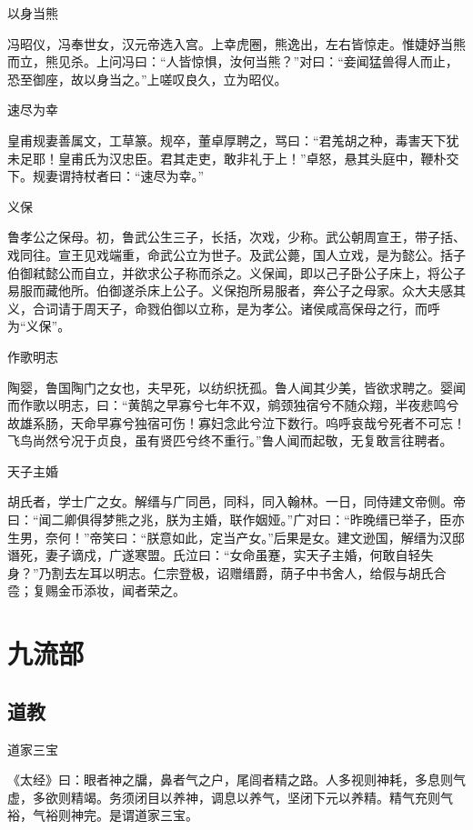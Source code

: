 \documentclass[a4paper,12pt,UTF8,twoside]{ctexbook}
\begin{document}
    以身当熊
    
    冯昭仪，冯奉世女，汉元帝选入宫。上幸虎圈，熊逸出，左右皆惊走。惟婕妤当熊而立，熊见杀。上问冯曰：“人皆惊惧，汝何当熊？”对曰：“妾闻猛兽得人而止，恐至御座，故以身当之。”上嗟叹良久，立为昭仪。
    
    速尽为幸
    
    皇甫规妻善属文，工草篆。规卒，董卓厚聘之，骂曰：“君羗胡之种，毒害天下犹未足耶！皇甫氏为汉忠臣。君其走吏，敢非礼于上！”卓怒，悬其头庭中，鞭朴交下。规妻谓持杖者曰：“速尽为幸。”
    
    义保
    
    鲁孝公之保母。初，鲁武公生三子，长括，次戏，少称。武公朝周宣王，带子括、戏同往。宣王见戏端重，命武公立为世子。及武公薨，国人立戏，是为懿公。括子伯御弒懿公而自立，并欲求公子称而杀之。义保闻，即以己子卧公子床上，将公子易服而藏他所。伯御遂杀床上公子。义保抱所易服者，奔公子之母家。众大夫感其义，合词请于周天子，命戮伯御以立称，是为孝公。诸侯咸高保母之行，而呼为“义保”。
    
    作歌明志
    
    陶婴，鲁国陶门之女也，夫早死，以纺织抚孤。鲁人闻其少美，皆欲求聘之。婴闻而作歌以明志，曰：“黄鹄之早寡兮七年不双，鹓颈独宿兮不随众翔，半夜悲鸣兮故雄系肠，天命早寡兮独宿可伤！寡妇念此兮泣下数行。呜呼哀哉兮死者不可忘！飞鸟尚然兮况于贞良，虽有贤匹兮终不重行。”鲁人闻而起敬，无复敢言往聘者。
    
    天子主婚
    
    胡氏者，学士广之女。解缙与广同邑，同科，同入翰林。一日，同侍建文帝侧。帝曰：“闻二卿俱得梦熊之兆，朕为主婚，联作姻娅。”广对曰：“昨晚缙已举子，臣亦生男，奈何！”帝笑曰：“朕意如此，定当产女。”后果是女。建文逊国，解缙为汉邸谮死，妻子谪戍，广遂寒盟。氏泣曰：“女命虽蹇，实天子主婚，何敢自轻失身？”乃割去左耳以明志。仁宗登极，诏赠缙爵，荫子中书舍人，给假与胡氏合卺；复赐金币添妆，闻者荣之。
    
    \part{九流部}
    
    \chapter{道教}
    
    道家三宝
    
    《太经》曰：眼者神之牖，鼻者气之户，尾闾者精之路。人多视则神耗，多息则气虚，多欲则精竭。务须闭目以养神，调息以养气，坚闭下元以养精。精气充则气裕，气裕则神完。是谓道家三宝。
    
\end{document}
